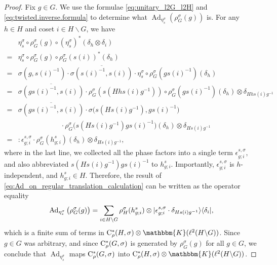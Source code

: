 \documentclass{amsart}
\numberwithin{figure}{section}
\numberwithin{equation}{section}
\numberwithin{table}{section}
\theoremstyle{plain}
\theoremstyle{definition}
\theoremstyle{remark}
\theoremstyle{nonumber}
\newcommand{\Cpt}{\mathbb{K}}
\newcommand{\Cst}{\relax\ifmmode\mathrm{C}^*\else\textup{C*}\fi}
\newcommand{\Cstr}{\Cst_\rho} %
\newcommand{\Ad}{\operatorname{Ad}} %
\renewcommand{\mathbb}{\mathbbm} %
\DeclarePairedDelimiter{\ket}{\lvert}{\rangle} %
\DeclarePairedDelimiter{\bra}{\langle}{\rvert} %
\begin{document}
\begin{proof}
Fix $g\in G$. We use the formulae \eqref{eq:unitary_l2G_l2H} and \eqref{eq:twisted.inverse.formula} to determine what $\Ad_{\eta_s^\sigma}(\rho_G^\sigma(g))$ is.
For any $h\in H$ and coset $i\in H\backslash G$, we have
\begin{equation}\label{eq:Ad_on_regular_translation_calculation}
\begin{aligned}
&\eta_s^\sigma\circ \rho_G^\sigma(g)\circ(\eta_s^\sigma)^*(\delta_h\otimes\delta_{i})\\
=&\eta_s^\sigma\circ \rho_G^\sigma(g)\circ\rho_G^\sigma(s(i))^*(\delta_{h})\\
=&\sigma(g,s(i)^{-1})\cdot\overline{\sigma(s(i)^{-1},s(i))}\cdot \eta_s^\sigma\circ\rho_G^\sigma(gs(i)^{-1})(\delta_h)\\
=&\overline{\sigma(gs(i)^{-1},s(i))}\cdot\rho_G^\sigma(s(Hhs(i)g^{-1}))\circ\rho_G^\sigma(gs(i)^{-1})(\delta_h)\otimes\delta_{Hhs(i)g^{-1}}\\
=&\overline{\sigma(gs(i)^{-1},s(i))}\cdot\sigma\big(s(Hs(i)g^{-1}),gs(i)^{-1}\big)\\
&\qquad\qquad\qquad \cdot\rho_G^\sigma\big(s(Hs(i)g^{-1})gs(i)^{-1}\big)(\delta_h)\otimes\delta_{Hs(i)g^{-1}}\\
=&\colon\epsilon^{s,\sigma}_{g;i}\cdot \rho_G^\sigma(h^s_{g;i})(\delta_h)\otimes\delta_{Hs(i)g^{-1}},
\end{aligned}
\end{equation}
where in the last line, we collected all the phase factors into a single
term $\epsilon^{s,\sigma}_{g;i}$,
and also abbreviated $s(Hs(i)g^{-1})gs(i)^{-1}$ to $h^s_{g;i}$.
Importantly, $\epsilon^{s,\sigma}_{g;i}$ is $h$-independent, and
$h^s_{g;i}\in H$. Therefore, the result of
\eqref{eq:Ad_on_regular_translation_calculation} can be written as the operator equality
\begin{equation}\label{eq:Ad_on_regular_translation}
\Ad_{\eta_{s}^\sigma}\big(\rho_G^\sigma(g)\big)=\sum_{i\in H\backslash G}
\rho_H^\sigma(h^s_{g;i})\otimes
\ket{\epsilon^{s,\sigma}_{g;i}\cdot\delta_{Hs(i) g^{-1}}}\bra{\delta_i},
\end{equation}
which is a finite sum of terms in
$\Cstr(H,\sigma)\otimes\Cpt(\ell^2(H\backslash G))$. Since $g\in G$ was
arbitrary, and since \( \Cstr(G,\sigma) \) is generated by \(
\rho_G^\sigma(g) \) for all 
\( g\in G \), we conclude that $\Ad_{\eta_{s}^\sigma}$ maps
\( \Cstr(G,\sigma) \) into \(
\Cstr(H,\sigma)\otimes\Cpt(\ell^2(H\backslash G)) \).


\end{proof}
\end{document}
